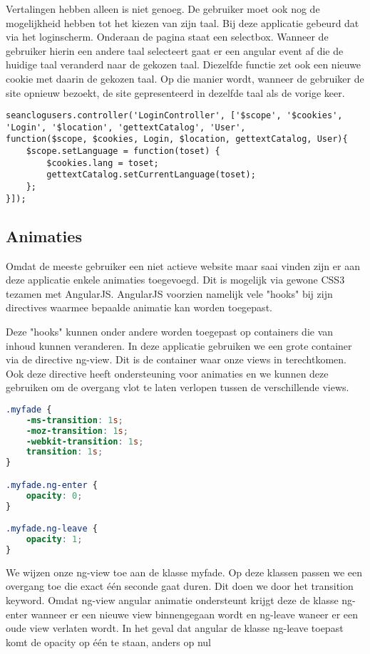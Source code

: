 \documentclass[a4paper,11pt]{article}
\begin{document}
Vertalingen hebben alleen is niet genoeg. De gebruiker moet ook nog de mogelijkheid hebben tot het kiezen van zijn taal. Bij deze applicatie gebeurd dat via het loginscherm. Onderaan de pagina staat een selectbox. Wanneer de gebruiker hierin een andere taal selecteert gaat er een angular event af die de huidige taal veranderd naar de gekozen taal. Diezelfde functie zet ook een nieuwe cookie met daarin de gekozen taal. Op die manier wordt, wanneer de gebruiker de site opnieuw bezoekt, de site gepresenteerd in dezelfde taal als de vorige keer.

\begin{lstlisting}
seanclogusers.controller('LoginController', ['$scope', '$cookies', 'Login', '$location', 'gettextCatalog', 'User',
function($scope, $cookies, Login, $location, gettextCatalog, User){	
	$scope.setLanguage = function(toset) {
		$cookies.lang = toset;
		gettextCatalog.setCurrentLanguage(toset);
	};
}]);
\end{lstlisting}

\subsection{Animaties}
Omdat de meeste gebruiker een niet actieve website maar saai vinden zijn er aan deze applicatie enkele animaties toegevoegd. Dit is mogelijk via gewone CSS3 tezamen met AngularJS. AngularJS voorzien namelijk vele "hooks" bij zijn directives waarmee bepaalde animatie kan worden toegepast.\cite{angular:animations}

Deze "hooks" kunnen onder andere worden toegepast op containers die van inhoud kunnen veranderen. In deze applicatie gebruiken we een grote container via de directive ng-view. Dit is de container waar onze views in terechtkomen. Ook deze directive heeft ondersteuning voor animaties en we kunnen deze gebruiken om de overgang vlot te laten verlopen tussen de verschillende views.
\begin{lstlisting}[language=css]
.myfade {
	-ms-transition: 1s;
	-moz-transition: 1s;
	-webkit-transition: 1s;
	transition: 1s;
}

.myfade.ng-enter {
	opacity: 0;
}

.myfade.ng-leave {
	opacity: 1;
}
\end{lstlisting}
We wijzen onze ng-view toe aan de klasse myfade. Op deze klassen passen we een overgang toe die exact één seconde gaat duren. Dit doen we door het transition keyword. Omdat ng-view angular animatie ondersteunt krijgt deze de klasse ng-enter wanneer er een nieuwe view binnengegaan wordt en ng-leave waneer er een oude view verlaten wordt. In het geval dat angular de klasse ng-leave toepast komt de opacity op één te staan, anders op nul
\end{document}
